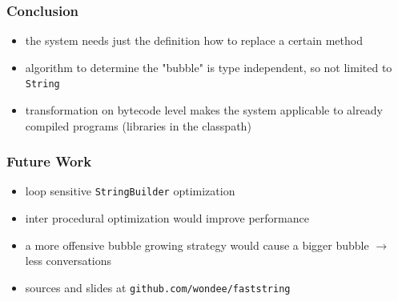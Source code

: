 \documentclass{beamer}
\begin{document}
\begin{frame}
	\frametitle{Conclusion}
	\begin{itemize}
      \item the system needs just the definition how to replace a certain method
		\item algorithm to determine the "bubble" is type independent, so not limited to \texttt{String}
		\item transformation on bytecode level makes the system applicable to already compiled programs (libraries in the classpath) 
	\end{itemize}
\end{frame}

\begin{frame}
	\frametitle{Future Work}
  \begin{itemize}
    \item loop sensitive \texttt{StringBuilder} optimization 
    \item inter procedural optimization would improve performance 
    \item a more offensive bubble growing strategy would cause a bigger bubble $\rightarrow$ less conversations
    \item sources and slides at \texttt{github.com/wondee/faststring}
  \end{itemize}
\end{frame}
\end{document}
